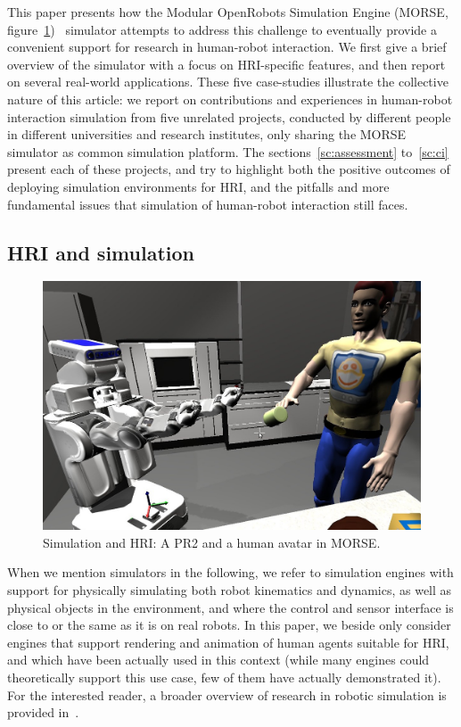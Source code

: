 \documentclass{llncs}
\begin{document}
This paper presents how the Modular OpenRobots Simulation Engine (MORSE,
figure~\ref{fig|morse-hri})~\cite{morse_simpar_2012} simulator attempts to
address this challenge to eventually provide a convenient support for research
in human-robot interaction. We first give a brief overview of the simulator
with a focus on HRI-specific features, and then report on several real-world
applications. These five case-studies illustrate the collective nature of this
article: we report on contributions and experiences in human-robot interaction
simulation from five unrelated projects, conducted by different people in
different universities and research institutes, only sharing the MORSE simulator
as common simulation platform. The sections~\ref{sc:assessment} to~\ref{sc:ci}
present each of these projects, and try to highlight both the positive
outcomes of deploying simulation environments for HRI, and the pitfalls and more
fundamental issues that simulation of human-robot interaction still faces.

\subsection*{HRI and simulation}

\begin{figure}[t]
      \centering 
      \includegraphics[width=0.7\linewidth]{morse_pr2.jpg}
      \caption{Simulation and HRI: A PR2 and a human avatar in MORSE.}
      \label{fig|morse-hri}
\end{figure}

When we mention simulators in the following, we refer to simulation engines with
support for physically simulating both robot kinematics and dynamics, as well as
physical objects in the environment, and where the control and sensor interface
is close to or the same as it is on real robots. In this paper, we beside
only consider engines that support rendering and animation of human agents
suitable for HRI, and which have been actually used in this context (while many
engines could theoretically support this use case, few of them have actually
demonstrated it). For the interested reader, a broader overview of research in
robotic simulation is provided in~\cite{Ando2010}.
\end{document}
